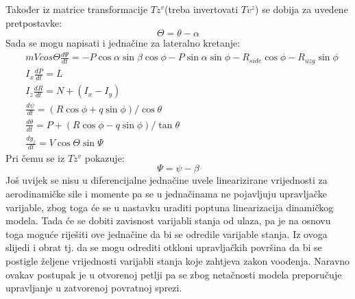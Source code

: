 Također iz matrice transformacije $Tz^v$(treba invertovati $Tv^z$) se dobija za uvedene pretpostavke:
\begin{equation}
    \Theta = \theta - \alpha
\end{equation}
Sada se mogu napisati i jednačine za lateralno kretanje:
\begin{align}
    &mVcos\Theta \frac{d\Psi}{dt}=-P\cos\alpha \sin\beta \cos\phi - P\sin\alpha\sin\phi 
    - R_{side}\cos\phi - R_{uzg}\sin\phi\\
    &I_x\frac{dP}{dt}=L\\
    &I_z\frac{dR}{dt}=N+(I_x-I_y)\\
    &\frac{d\psi}{dt}=(R\cos\phi+q\sin\phi)/\cos\theta\\
    &\frac{d\theta}{dt}=P+(R\cos\phi - q\sin\phi)/\tan\theta\\
    &\frac{dy_z}{dt}=V\cos\Theta\sin\Psi
\end{align}
Pri čemu se iz $Tz^v$ pokazuje:
\begin{equation}
    \Psi = \psi-\beta
\end{equation}
Još uvijek se nisu u diferencijalne jednačine uvele linearizirane vrijednosti za aerodinamičke 
sile i momente pa se u jednačinama ne pojavljuju upravljačke varijable, zbog toga će se u nastavku uraditi
poptuna linearizacija dinamičkog modela. Tada će se dobiti zavisnost varijabli stanja od ulaza, pa 
je na osnovu toga moguće riješiti ove jednačine da bi se odredile varijable stanja. Iz ovoga slijedi i obrat 
tj. da se mogu odrediti otkloni upravljačkih površina da bi se postigle željene vrijednosti varijabli stanja 
koje zahtjeva zakon voođenja. Naravno ovakav postupak je u otvorenoj petlji pa se zbog netačnosti modela 
preporučuje upravljanje u zatvorenoj povratnoj sprezi. 
